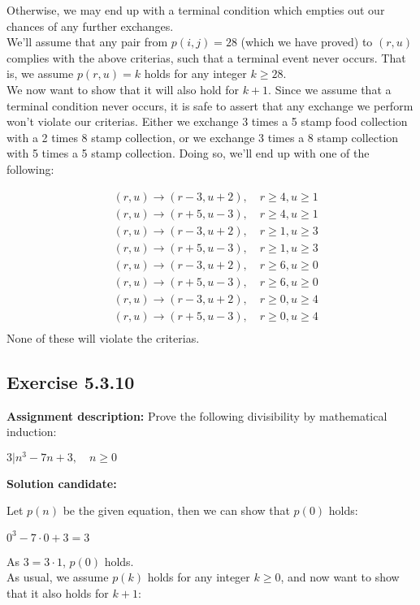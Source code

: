\documentclass{report}
\newcommand{\cent}[1]{\begin{center}#1\end{center}}
\newcommand{\mAlign}[1]{\begin{align*}#1\end{align*}}
\newcommand{\AssignmentDescription}{\textbf{Assignment description: }}
\newcommand{\Solution}{\textbf{Solution candidate: }}
\newcommand{\QED}{\boxed{}}
\newcommand{\Exercise}[1]{\subsection{Exercise #1}}
\newcommand{\defaultEnumerateLabel}{\textbf{\alph*.}}
\begin{document}
\begin{enumerate}[label=\defaultEnumerateLabel]
 		Otherwise, we may end up with a terminal condition which empties out our chances of any further exchanges.\\
 		
 		We'll assume that any pair from $p(i,j) = 28$ (which we have proved) to $(r,u)$ complies with the above criterias, such that a terminal event never occurs. That is, we assume $p(r,u) = k$ holds for any integer $k \geq 28$. \\
 		
 		We now want to show that it will also hold for $k+1$. Since we assume that a terminal condition never occurs, it is safe to assert that any exchange we perform won't violate our criterias. Either we exchange 3 times a 5 stamp food collection with a 2 times 8 stamp collection, or we exchange 3 times a 8 stamp collection with 5 times a 5 stamp collection. Doing so, we'll end up with one of the following:
 		
 		\mAlign{
 			&(r,u) \to (r-3,u+2), \quad r \geq 4, u \geq 1 \\
 			&(r,u) \to (r+5,u-3), \quad r \geq 4, u \geq 1 \\
 			&(r,u) \to (r-3,u+2), \quad r \geq 1, u \geq 3 \\
 			&(r,u) \to (r+5,u-3), \quad r \geq 1, u \geq 3 \\
 			&(r,u) \to (r-3,u+2), \quad r \geq 6, u \geq 0 \\
 			&(r,u) \to (r+5,u-3), \quad r \geq 6, u \geq 0 \\
 			&(r,u) \to (r-3,u+2), \quad r \geq 0, u \geq 4 \\
 			&(r,u) \to (r+5,u-3), \quad r \geq 0, u \geq 4 \\
 		}
 		None of these will violate the criterias.\\
 		\QED
 	\end{enumerate}
 	
 	\Exercise{5.3.10}
 	
 	\AssignmentDescription
 	Prove the following divisibility by mathematical induction:
 	
 	\cent{$3 | n^3-7n + 3, \quad n \geq 0$}
 	
 	\Solution
 	
 	Let $p(n)$ be the given equation, then we can show that $p(0)$ holds:
 	
 	\cent{$0^3-7 \cdot 0 +3 = 3$}
 	
 	As $3 = 3 \cdot 1$, $p(0)$ holds.\\
 	
 	As usual, we assume $p(k)$ holds for any integer $k \geq 0$, and now want to show that it also holds for $k+1$:
 	
\end{document}
